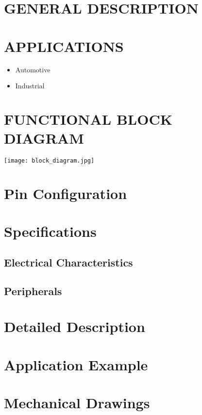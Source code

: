 \documentclass{datasheet}
\begin{document}
\section{GENERAL DESCRIPTION}
\section{APPLICATIONS}
\begin{itemize}
	\item Automotive
	\item Industrial
\end{itemize}

\section{FUNCTIONAL BLOCK DIAGRAM}
\texttt{[image: block\_diagram.jpg]}


\pagebreak
\tableofcontents
\pagebreak



\section{Pin Configuration}

\section{Specifications}
\subsection{Electrical Characteristics}
\subsection{Peripherals}




\section{Detailed Description}

\section{Application Example}

\section{Mechanical Drawings}
\end{document}
